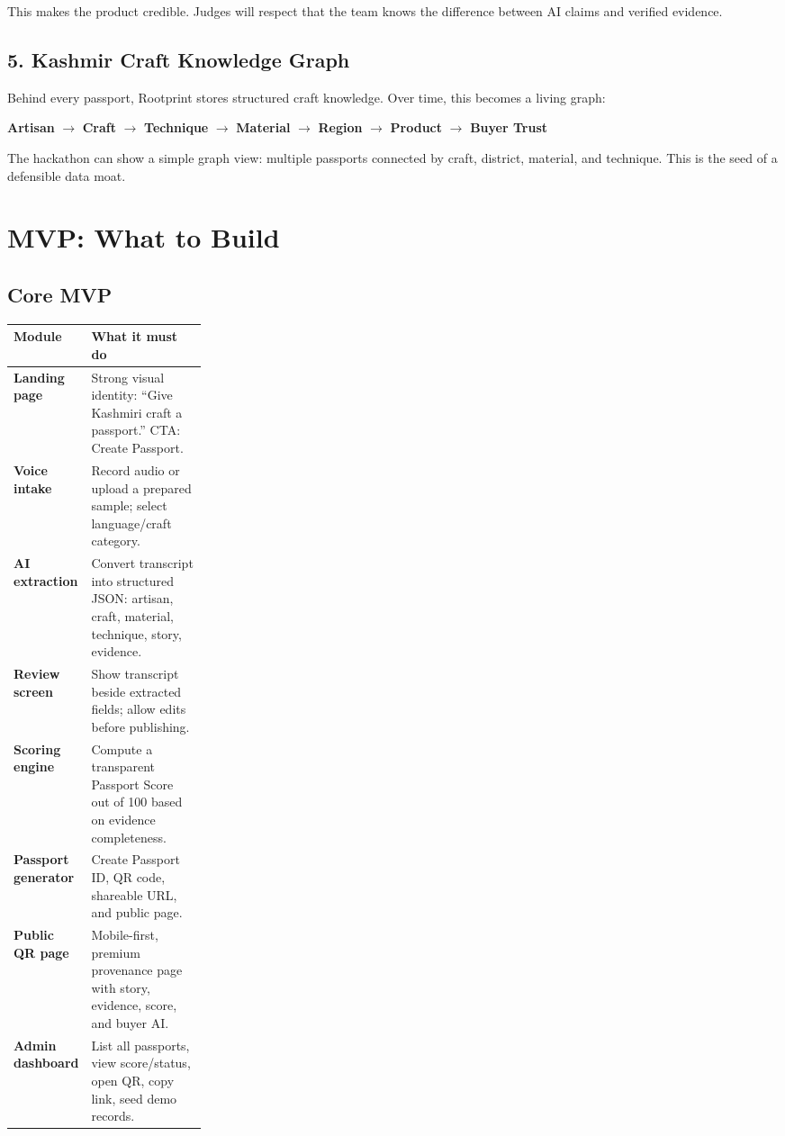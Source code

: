 \documentclass[11pt,a4paper]{article}
\begin{document}
This makes the product credible. Judges will respect that the team knows the difference between AI claims and verified evidence.

\subsection{5. Kashmir Craft Knowledge Graph}

Behind every passport, Rootprint stores structured craft knowledge. Over time, this becomes a living graph:

\begin{center}
\textbf{Artisan} $\rightarrow$ \textbf{Craft} $\rightarrow$ \textbf{Technique} $\rightarrow$ \textbf{Material} $\rightarrow$ \textbf{Region} $\rightarrow$ \textbf{Product} $\rightarrow$ \textbf{Buyer Trust}
\end{center}

The hackathon can show a simple graph view: multiple passports connected by craft, district, material, and technique. This is the seed of a defensible data moat.

\section{MVP: What to Build}

\subsection{Core MVP}

\begin{center}
\begin{tabularx}{\linewidth}{>{\bfseries}p{0.25\linewidth}X}
\toprule
Module & What it must do \\
\midrule
Landing page & Strong visual identity: ``Give Kashmiri craft a passport.'' CTA: Create Passport. \\
Voice intake & Record audio or upload a prepared sample; select language/craft category. \\
AI extraction & Convert transcript into structured JSON: artisan, craft, material, technique, story, evidence. \\
Review screen & Show transcript beside extracted fields; allow edits before publishing. \\
Scoring engine & Compute a transparent Passport Score out of 100 based on evidence completeness. \\
Passport generator & Create Passport ID, QR code, shareable URL, and public page. \\
Public QR page & Mobile-first, premium provenance page with story, evidence, score, and buyer AI. \\
Admin dashboard & List all passports, view score/status, open QR, copy link, seed demo records. \\
\bottomrule
\end{tabularx}
\end{center}
\end{document}
